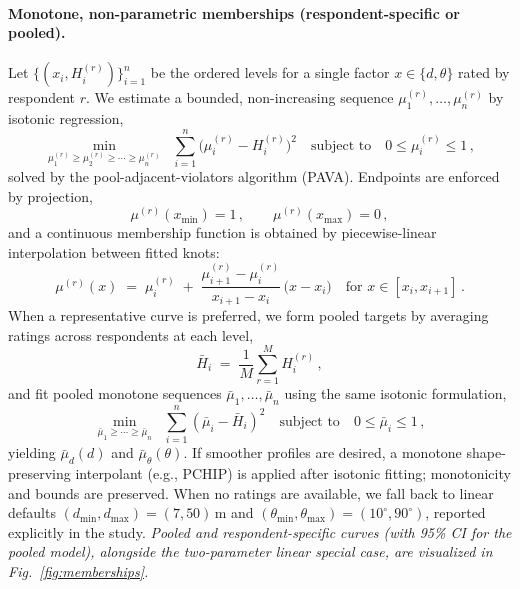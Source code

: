 \documentclass[final,3p,times,review]{elsarticle}
\begin{document}
\paragraph{Monotone, non-parametric memberships (respondent-specific or pooled).}
Let $\{(x_i,H^{(r)}_i)\}_{i=1}^{n}$ be the ordered levels for a single factor $x\!\in\!\{d,\theta\}$ rated by respondent $r$. We estimate a bounded, non-increasing sequence $\mu^{(r)}_1,\dots,\mu^{(r)}_n$ by isotonic regression,
\begin{equation}
\min_{\mu^{(r)}_1\ge \mu^{(r)}_2 \ge \cdots \ge \mu^{(r)}_n}\;\; \sum_{i=1}^{n} \big(\mu^{(r)}_i - H^{(r)}_i\big)^2
\quad \text{subject to} \quad 0 \le \mu^{(r)}_i \le 1 \,,
\label{eq:isotonic-individual}
\end{equation}
solved by the pool-adjacent-violators algorithm (PAVA). Endpoints are enforced by projection,
\begin{equation}
\mu^{(r)}(x_{\min}) = 1 \,, \qquad \mu^{(r)}(x_{\max}) = 0 \,,
\label{eq:anchors}
\end{equation}
and a continuous membership function is obtained by piecewise-linear interpolation between fitted knots:
\begin{equation}
\mu^{(r)}(x) \;=\; \mu^{(r)}_i \;+\; \frac{\mu^{(r)}_{i+1}-\mu^{(r)}_i}{\,x_{i+1}-x_i\,}\,\big(x-x_i\big)
\quad \text{for } x\in[x_i,x_{i+1}] \,.
\label{eq:interp}
\end{equation}
When a representative curve is preferred, we form pooled targets by averaging ratings across respondents at each level,
\begin{equation}
\bar{H}_i \;=\; \frac{1}{M}\sum_{r=1}^{M} H^{(r)}_i \,,
\label{eq:pooled-mean}
\end{equation}
and fit pooled monotone sequences $\bar{\mu}_1,\ldots,\bar{\mu}_n$ using the same isotonic formulation,
\begin{equation}
\min_{\bar{\mu}_1\ge \cdots \ge \bar{\mu}_n}\;\; \sum_{i=1}^{n} (\bar{\mu}_i - \bar{H}_i)^2
\quad \text{subject to} \quad 0 \le \bar{\mu}_i \le 1 \,,
\label{eq:isotonic-pooled}
\end{equation}
yielding $\bar{\mu}_d(d)$ and $\bar{\mu}_\theta(\theta)$. If smoother profiles are desired, a monotone shape-preserving interpolant (e.g., PCHIP) is applied after isotonic fitting; monotonicity and bounds are preserved. When no ratings are available, we fall back to linear defaults $(d_{\min},d_{\max})=(7,50)$\,m and $(\theta_{\min},\theta_{\max})=(10^\circ,90^\circ)$, reported explicitly in the study.
\textit{Pooled and respondent-specific curves (with 95\% CI for the pooled model), alongside the two-parameter linear special case, are visualized in Fig.~\ref{fig:memberships}.}
\end{document}
